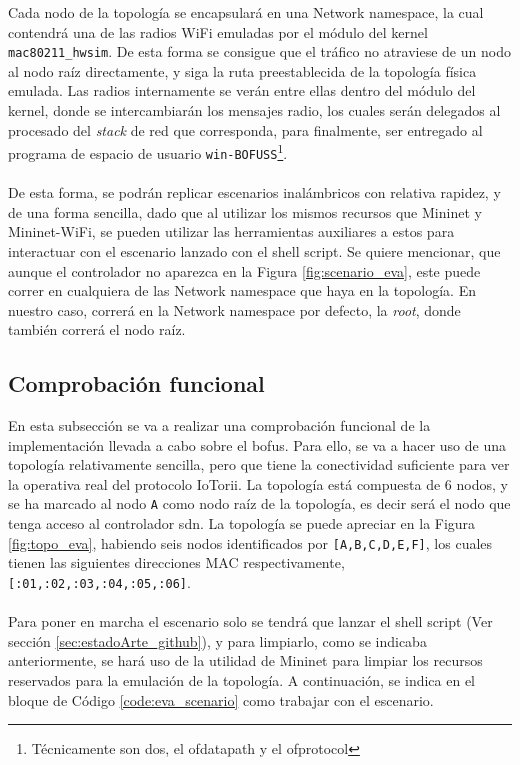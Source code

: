 Cada nodo de la topología se encapsulará en una Network namespace, la cual contendrá una de las radios WiFi emuladas por el módulo del kernel \texttt{mac80211\_hwsim}. De esta forma se consigue que el tráfico no atraviese de un nodo al nodo raíz directamente, y siga la ruta preestablecida de la topología física emulada. Las radios internamente se verán entre ellas dentro del módulo del kernel, donde se intercambiarán los mensajes radio, los cuales serán delegados al procesado del \textit{stack} de red que corresponda, para finalmente, ser entregado al programa de espacio de usuario \texttt{win-BOFUSS}\footnote{Técnicamente son dos, el ofdatapath y el ofprotocol}.\\
\\
De esta forma, se podrán replicar escenarios inalámbricos con relativa rapidez, y de una forma sencilla, dado que al utilizar los mismos recursos que Mininet y Mininet-WiFi, se pueden utilizar las herramientas auxiliares a estos para interactuar con el escenario lanzado con el shell script. Se quiere mencionar, que aunque el controlador no aparezca en la Figura \ref{fig:scenario_eva}, este puede correr en cualquiera de las Network namespace que haya en la topología. En nuestro caso, correrá en la Network namespace por defecto, la \textit{root}, donde también correrá el nodo raíz.

\subsection{Comprobación funcional}

En esta subsección se va a realizar una comprobación funcional de la implementación llevada a cabo sobre el \gls{bofus}. Para ello, se va a hacer uso de una topología relativamente sencilla, pero que tiene la conectividad suficiente para ver la operativa real del protocolo IoTorii. La topología está compuesta de 6 nodos, y se ha marcado al nodo \texttt{A} como nodo raíz de la topología, es decir será el nodo que tenga acceso al controlador \gls{sdn}. La topología se puede apreciar en la Figura \ref{fig:topo_eva}, habiendo seis nodos identificados por \texttt{[A,B,C,D,E,F]}, los cuales tienen las siguientes direcciones MAC respectivamente, \texttt{[:01,:02,:03,:04,:05,:06]}.\\
\\
Para poner en marcha el escenario solo se tendrá que lanzar el shell script (Ver sección \ref{sec:estadoArte_github}), y para limpiarlo, como se indicaba anteriormente, se hará uso de la utilidad de Mininet para limpiar los recursos reservados para la emulación de la topología. A continuación, se indica en el bloque de Código \ref{code:eva_scenario} como trabajar con el escenario.\\

